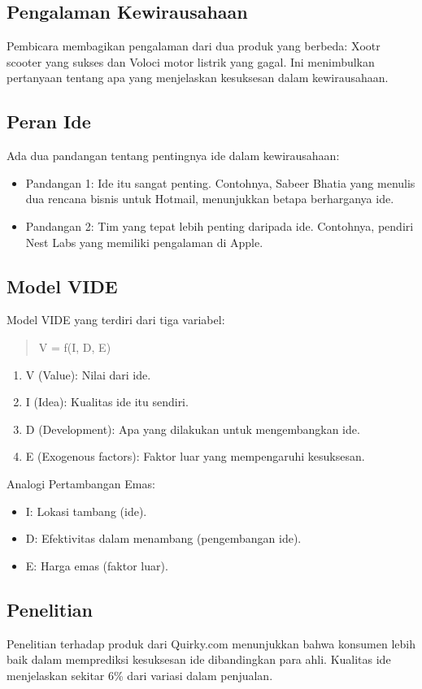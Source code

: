 \documentclass{article}
\begin{document}
\subsection{Pengalaman Kewirausahaan}
Pembicara membagikan pengalaman dari dua produk yang berbeda: Xootr scooter yang sukses dan Voloci motor listrik yang gagal. Ini menimbulkan pertanyaan tentang apa yang menjelaskan kesuksesan dalam kewirausahaan.

\subsection{Peran Ide}
Ada dua pandangan tentang pentingnya ide dalam kewirausahaan:
\begin{itemize}
    \item Pandangan 1: Ide itu sangat penting. Contohnya, Sabeer Bhatia yang menulis dua rencana bisnis untuk Hotmail, menunjukkan betapa berharganya ide.
    \item Pandangan 2: Tim yang tepat lebih penting daripada ide. Contohnya, pendiri Nest Labs yang memiliki pengalaman di Apple.
\end{itemize}

\subsection{Model VIDE}
Model VIDE yang terdiri dari tiga variabel:
\begin{quotation}
    V = f(I, D, E)
\end{quotation}
\begin{enumerate}
    \item V (Value): Nilai dari ide.
    \item I (Idea): Kualitas ide itu sendiri.
    \item D (Development): Apa yang dilakukan untuk mengembangkan ide.
    \item E (Exogenous factors): Faktor luar yang mempengaruhi kesuksesan.
\end{enumerate}
Analogi Pertambangan Emas:
\begin{itemize}
    \item I: Lokasi tambang (ide).
    \item D: Efektivitas dalam menambang (pengembangan ide).
    \item E: Harga emas (faktor luar).
\end{itemize}

\subsection{Penelitian}
Penelitian terhadap produk dari Quirky.com menunjukkan bahwa konsumen lebih baik dalam memprediksi kesuksesan ide dibandingkan para ahli. Kualitas ide menjelaskan sekitar 6\% dari variasi dalam penjualan.
\end{document}
